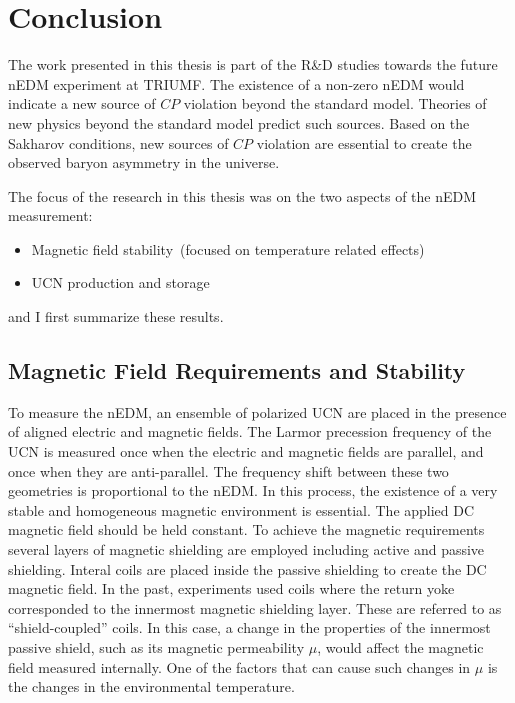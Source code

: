 \chapter{Conclusion\label{chap:overall}}


The work presented in this thesis is part of the R\&D studies towards
the future nEDM experiment at TRIUMF. The existence of a non-zero nEDM
would indicate a new source of $CP$ violation beyond the standard
model. Theories of new physics beyond the standard model predict such
sources. Based on the Sakharov conditions, new sources of $CP$
violation are essential to create the observed baryon asymmetry in the
universe.

The focus of the research in this thesis was on the two aspects of the
nEDM measurement:
\begin{itemize}
\item Magnetic field stability~(focused on temperature related
  effects)
\item UCN production and storage
\end{itemize}
and I first summarize these results.
\section{ Magnetic Field Requirements and Stability}
To measure the nEDM, an ensemble of polarized UCN are placed in the
presence of aligned electric and magnetic fields. The Larmor
precession frequency of the UCN is measured once when the electric and
magnetic fields are parallel, and once when they are
anti-parallel. The frequency shift between these two geometries is
proportional to the nEDM. In this process, the existence of a very
stable and homogeneous magnetic environment is essential. The applied
DC magnetic field should be held constant. To achieve the magnetic
requirements several layers of magnetic shielding are employed
including active and passive shielding. Interal coils are placed
inside the passive shielding to create the DC magnetic field.  In the
past, experiments used coils where the return yoke corresponded to the
innermost magnetic shielding layer. These are referred to as
``shield-coupled'' coils. In this case, a change in the properties of
the innermost passive shield, such as its magnetic permeability $\mu$,
would affect the magnetic field measured internally. One of the
factors that can cause such changes in $\mu$ is the changes in the
environmental temperature.

